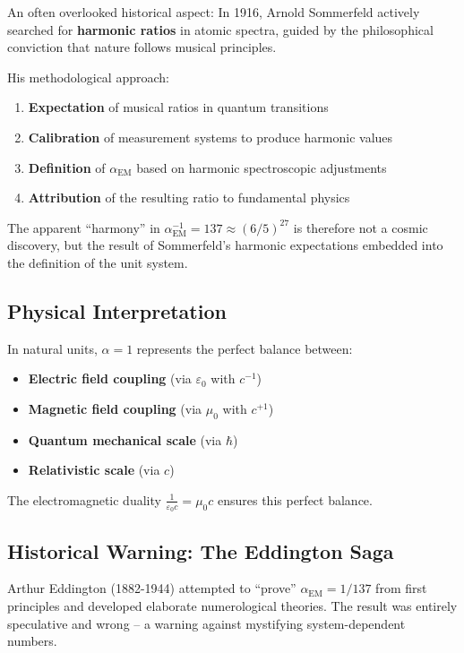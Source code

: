 An often overlooked historical aspect: In 1916, Arnold Sommerfeld actively searched for \textbf{harmonic ratios} in atomic spectra, guided by the philosophical conviction that nature follows musical principles.

His methodological approach:
\begin{enumerate}
	\item \textbf{Expectation} of musical ratios in quantum transitions
	\item \textbf{Calibration} of measurement systems to produce harmonic values
	\item \textbf{Definition} of $\alpha_{\text{EM}}$ based on harmonic spectroscopic adjustments
	\item \textbf{Attribution} of the resulting ratio to fundamental physics
\end{enumerate}

The apparent ``harmony'' in $\alpha_{\text{EM}}^{-1} = 137 \approx (6/5)^{27}$ is therefore not a cosmic discovery, but the result of Sommerfeld's harmonic expectations embedded into the definition of the unit system.

\subsection{Physical Interpretation}
\label{subsec:physical_interpretation}

In natural units, $\alpha = 1$ represents the perfect balance between:

\begin{itemize}
	\item \textbf{Electric field coupling} (via $\varepsilon_0$ with $c^{-1}$)
	\item \textbf{Magnetic field coupling} (via $\mu_0$ with $c^{+1}$)
	\item \textbf{Quantum mechanical scale} (via $\hbar$)
	\item \textbf{Relativistic scale} (via $c$)
\end{itemize}

The electromagnetic duality $\frac{1}{\varepsilon_0 c} = \mu_0 c$ ensures this perfect balance.

\subsection{Historical Warning: The Eddington Saga}
\label{subsec:eddington_warning}

Arthur Eddington (1882-1944) attempted to ``prove'' $\alpha_{\text{EM}} = 1/137$ from first principles and developed elaborate numerological theories. The result was entirely speculative and wrong -- a warning against mystifying system-dependent numbers.

